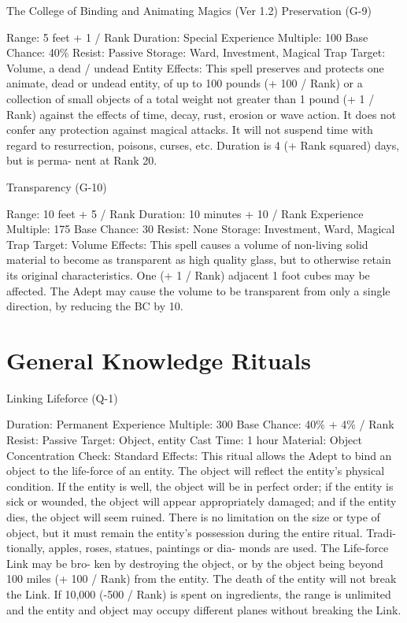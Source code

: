 \begin{Chapter}{The College of Binding and Animating Magics (Ver 1.2)}
Preservation (G-9) 


Range: 5 feet + 1 / Rank 
Duration: Special 
Experience Multiple: 100 
Base Chance: 40\% 
Resist: Passive 
Storage: Ward, Investment, Magical Trap 
Target: Volume, a dead / undead Entity 
Effects:  This  spell  preserves  and  protects  one  animate,  dead  or  undead  entity,  of  up  to  100  pounds 
(+ 100 / Rank) or a collection of small objects of a 
total weight not greater than 1 pound (+ 1 / Rank) 
against  the  effects  of  time,  decay,  rust,  erosion  or 
wave  action.  It  does  not  confer  any  protection 
against  magical  attacks.  It  will  not  suspend  time 
with  regard  to  resurrection,  poisons,  curses,  etc. 
Duration is 4 (+ Rank squared) days, but is perma-
nent at Rank 20. 

Transparency (G-10) 

Range: 10 feet + 5 / Rank 
Duration: 10 minutes + 10 / Rank 
Experience Multiple: 175 
Base Chance: 30%
Resist: None 
Storage: Investment, Ward, Magical Trap 
Target: Volume 
Effects:  This  spell  causes  a  volume  of  non-living 
solid  material  to  become  as  transparent  as  high 
quality  glass,  but  to  otherwise  retain  its  original 
characteristics.  One  (+  1  /  Rank)  adjacent  1  foot 
cubes  may  be  affected.  The  Adept  may  cause  the 
volume to be transparent from only a single direction, by reducing the BC by 10. 

\section{General Knowledge Rituals}

Linking Lifeforce (Q-1) 

Duration: Permanent 
Experience Multiple: 300 
Base Chance: 40\% + 4\% / Rank 
Resist: Passive 
Target: Object, entity 
Cast Time: 1 hour 
Material: Object 
Concentration Check: Standard 
Effects:  This  ritual  allows  the  Adept  to  bind  an 
object to the life-force of an entity. The object will 
reflect  the  entity’s  physical  condition.  If  the  entity 
is  well,  the  object  will  be  in  perfect  order;  if  the 
entity  is  sick  or  wounded,  the  object  will  appear 
appropriately  damaged;  and  if  the  entity  dies,  the 
object  will  seem  ruined.  There  is  no  limitation  on 
the  size  or  type  of  object,  but  it  must  remain  the 
entity’s  possession  during  the  entire  ritual.  Tradi-
tionally,  apples,  roses,  statues,  paintings  or  dia-
monds  are  used.  The  Life-force  Link  may  be  bro-
ken by destroying the object, or by the object being 
beyond  100  miles  (+  100  /  Rank)  from  the  entity. 
The  death  of  the  entity  will  not  break  the  Link.  If 
10,000  (-500  /  Rank)  is  spent  on  ingredients,  the 
range  is  unlimited  and  the  entity  and  object  may 
occupy different planes without breaking the Link. 


\end{Chapter}
